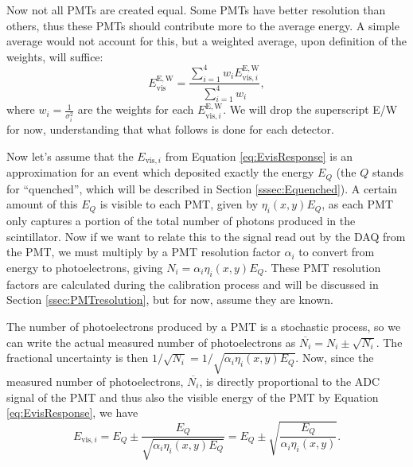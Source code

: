 Now not all PMTs are created equal. Some PMTs have better resolution than others, thus these PMTs
should contribute more to the average energy. A simple average would not account for this, but
a weighted average, upon definition of the weights, will suffice:
%
\begin{equation}
  E_{\mathrm{vis}}^\mathrm{E,W} = \frac{\sum_{i=1}^{4} w_i E_{\mathrm{vis},i}^{\mathrm{E,W}}}{\sum_{i=1}^{4} w_i},
\end{equation}
%
where $w_i=\frac{1}{\sigma_i^2}$ are the weights for each $E_{\mathrm{vis},i}^{\mathrm{E,W}}$. We will drop the superscript
E/W for now, understanding that what follows is done for each detector.

Now let's assume that the $E_{\mathrm{vis},i}$ from Equation \ref{eq:EvisResponse} is an approximation
for an event which deposited exactly the energy $E_Q$ (the $Q$ stands for ``quenched'', which will
be described in Section \ref{sssec:Equenched}). A certain amount of this $E_Q$ is visible to each
PMT, given by $\eta_i(x,y)E_Q$, as each PMT only captures a portion of the total number of photons produced
in the scintillator.
Now if we want to relate this to the signal read out by the DAQ
from the PMT, we must multiply by a PMT resolution factor $\alpha_i$ to convert from energy
to photoelectrons, giving $N_i = \alpha_i \eta_i(x,y) E_Q$.
These PMT resolution factors are calculated during the calibration process
and will be discussed in Section \ref{ssec:PMTresolution}, but for now, assume they are known.

The number of photoelectrons produced by a PMT is a stochastic process, so we can write the actual
measured number of photoelectrons as $\overline{N_i} = N_i \pm \sqrt{N_i}$. The fractional uncertainty
is then $1/\sqrt{N_i} = 1/\sqrt{\alpha_i \eta_i(x,y) E_Q}$. Now, since the measured number of photoelectrons,
$\overline{N_i}$, is directly proportional to the ADC signal of the PMT and thus also the visible energy
of the PMT by Equation \ref{eq:EvisResponse}, we have
%
\begin{equation}
  E_{\mathrm{vis},i} = E_Q \pm \frac{E_Q}{\sqrt{\alpha_i \eta_i(x,y) E_Q}} =  E_Q \pm \sqrt{\frac{E_Q}{\alpha_i \eta_i(x,y)}}.
  \label{eq:Evisi}
\end{equation}
%

